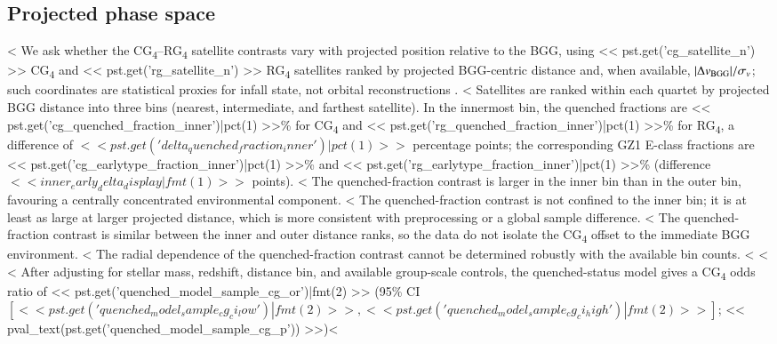 \documentclass{aa}
\newcommand{\CG}{CG\textsubscript{4}}
\newcommand{\RG}{RG\textsubscript{4}}
\begin{document}
\begin{appendix}
\subsection{Projected phase space}\label{app:phase_space}
<%
We ask whether the \CG{}--\RG{} satellite contrasts vary with projected position relative to the BGG, using << pst.get('cg_satellite_n') >> \CG{} and << pst.get('rg_satellite_n') >> \RG{} satellites ranked by projected BGG-centric distance and, when available, \(|\Delta v_{\rm BGG}|/\sigma_v\); such coordinates are statistical proxies for infall state, not orbital reconstructions \citep{Mahajan+11,Oman&Hudson16,Wetzel+13}.
<%
Satellites are ranked within each quartet by projected BGG distance into three bins (nearest, intermediate, and farthest satellite). In the innermost bin, the quenched fractions are << pst.get('cg_quenched_fraction_inner')|pct(1) >>\% for \CG{} and << pst.get('rg_quenched_fraction_inner')|pct(1) >>\% for \RG, a difference of \(<< pst.get('delta_quenched_fraction_inner')|pct(1) >>\) percentage points; the corresponding GZ1 E-class fractions are << pst.get('cg_earlytype_fraction_inner')|pct(1) >>\% and << pst.get('rg_earlytype_fraction_inner')|pct(1) >>\% (difference \(<< inner_early_delta_display|fmt(1) >>\) points).
<%
The quenched-fraction contrast is larger in the inner bin than in the outer bin, favouring a centrally concentrated environmental component.
<%
The quenched-fraction contrast is not confined to the inner bin; it is at least as large at larger projected distance, which is more consistent with preprocessing or a global sample difference.
<%
The quenched-fraction contrast is similar between the inner and outer distance ranks, so the data do not isolate the \CG{} offset to the immediate BGG environment.
<%
The radial dependence of the quenched-fraction contrast cannot be determined robustly with the available bin counts.
<%
<%
<%
After adjusting for stellar mass, redshift, distance bin, and available group-scale controls, the quenched-status model gives a \CG{} odds ratio of << pst.get('quenched_model_sample_cg_or')|fmt(2) >> (95\% CI \([<< pst.get('quenched_model_sample_cg_ci_low')|fmt(2) >>, << pst.get('quenched_model_sample_cg_ci_high')|fmt(2) >>]\); << pval_text(pst.get('quenched_model_sample_cg_p')) >>)<%

\end{appendix}
\end{document}
